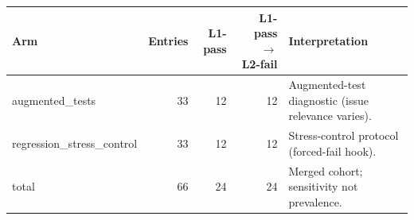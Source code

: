 \begin{tabular}{lrrrl}
\hline
Arm & Entries & L1-pass & L1-pass $\rightarrow$ L2-fail & Interpretation \\
\hline
augmented\_tests & 33 & 12 & 12 & Augmented-test diagnostic (issue relevance varies). \\
regression\_stress\_control & 33 & 12 & 12 & Stress-control protocol (forced-fail hook). \\
\hline
total & 66 & 24 & 24 & Merged cohort; sensitivity not prevalence. \\
\hline
\end{tabular}
